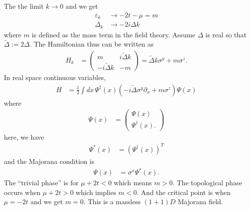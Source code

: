 The the limit $k\to 0$ and we get
\begin{align}
    \varepsilon_k &\to -2t - \mu = m\\
    \Delta_k &\to -2i\Delta k
\end{align}
where $m$ is defined as the mass term in the field theory.
Assume $\Delta$ is real so that $\tilde{\Delta}:= 2\Delta$.
The Hamiltonian thus can be written as
\begin{align}
    H_k &=
    \begin{pmatrix}
        m & i\tilde{\Delta}k\\
        -i\tilde{\Delta}k & -m
    \end{pmatrix}
    = \tilde{\Delta}k\sigma^y + m\sigma^z.
\end{align}
In real space continuous variables,
\begin{align}
    H &=
    \frac{1}{2}\int dx\,
    \Psi^\dagger(x)
    \left( -i\tilde{\Delta}\sigma^y \partial_x + m\sigma^z \right)
    \Psi(x)
\end{align}
where
\begin{align}
    \Psi(x) &=
    \begin{pmatrix}
        \Psi(x)\\
        \Psi^\dagger(x).
    \end{pmatrix}
\end{align}
here, we have
\begin{align}
    \Psi^*(x) &= \left( \Psi^\dagger(x) \right)^T
\end{align}
and the Majorana condition is
\begin{align}
    \Psi(x) &= \sigma^x \Psi^*(x).
\end{align}
The ``trivial phase'' is for $\mu + 2t < 0$ which means $m>0$.
The topological phase occurs when
$\mu + 2t > 0$ which implies $m < 0$.
And the critical point is when $\mu = -2t$ and we get $m=0$.
This is a massless $(1+1)D$ Majorana field.

